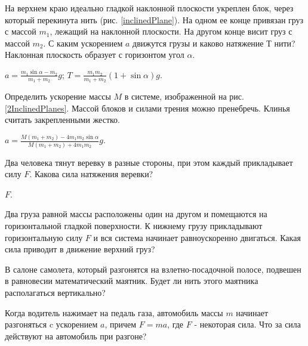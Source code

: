 \begin{ex} %
На верхнем краю идеально гладкой наклонной плоскости укреплен блок, через который перекинута нить (рис. \ref{inclinedPlane}). На одном ее конце привязан груз с массой $m_1$, лежащий на наклонной плоскости. На другом конце висит груз с массой $m_2$. С каким ускорением $a$ движутся грузы и каково натяжение $Т$ нити? Наклонная плоскость образует с горизонтом угол $\alpha$.
\begin{ans}
$a = \frac{m_1 \sin \alpha - m_2}{m_1 + m_2}g$; $T = \frac{m_1 m_2}{m_1 + m_2}\left( 1+ \sin \alpha \right)g$.
\end{ans}
\end{ex}

\begin{ex} %
Определить ускорение массы $M$ в системе, изображенной на рис. \ref{2InclinedPlanes}. Массой блоков и силами трения можно пренебречь. Клинья считать закрепленными жестко.
\begin{ans}
$a = \frac{M(m_1 + m_2) - 4 m_1 m_2 \sin \alpha}{M(m_1 + m_2) + 4 m_1 m_2}g$.
\end{ans}
\end{ex}

\qualProblems

\begin{ex} %
Два человека тянут веревку в разные стороны, при этом каждый прикладывает силу $F$. Какова сила натяжения веревки?
\begin{ans}
$F$.
\end{ans}
\end{ex}

\begin{ex} %
Два груза равной массы расположены один на другом и помещаются на горизонтальной гладкой поверхности. К нижнему грузу прикладывают горизонтальную силу $F$ и вся система начинает равноускоренно двигаться. Какая сила приводит в движение верхний груз?
\end{ex}

\begin{ex} %
В салоне самолета, который разгонятся на взлетно-посадочной полосе, подвешен в равновесии математический маятник. Будет ли нить этого маятника располагаться вертикально?
\end{ex}

\begin{ex} %
Когда водитель нажимает на педаль газа, автомобиль массы $m$ начинает разгоняться c ускорением $a$, причем $F = ma$, где $F$ - некоторая сила. Что за сила действуют на автомобиль при разгоне?
\end{ex}

